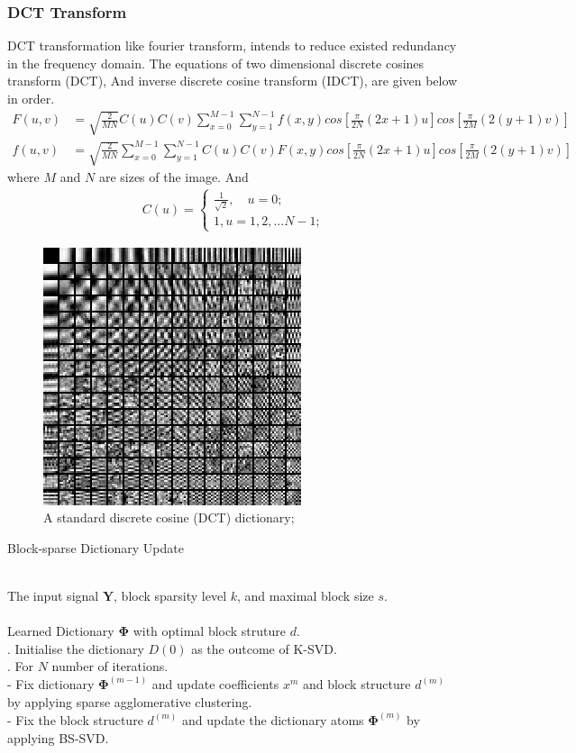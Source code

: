 
\subsubsection{DCT Transform}
DCT transformation like fourier transform, intends to reduce existed redundancy in the frequency domain. The equations of two dimensional discrete cosines transform (DCT), And inverse discrete cosine transform (IDCT), are given below in order.
\begin{align}
    F(u,v) &= \sqrt{\frac{2}{MN}}C(u)C(v)\sum_{x=0}^{M-1}\sum_{y=1}^{N-1}f(x,y)cos[\frac{\pi}{2N}(2x+1)u]cos[\frac{\pi}{2M}(2(y+1)v)] \\
    f(u,v) &= \sqrt{\frac{2}{MN}}\sum_{x=0}^{M-1}\sum_{y=1}^{N-1}C(u)C(v) F(x,y)cos[\frac{\pi}{2N}(2x+1)u]cos[\frac{\pi}{2M}(2(y+1)v)]
\end{align}
where $M$ and $N$ are sizes of the image. And 
\begin{align}
    C(u) = \begin{cases}
    \frac{1}{\sqrt{2}}, \quad u=0;\\
    1, u=1,2,...N-1;
    \end{cases}
\end{align}

\begin{figure}[!htbp]
\centering
\includegraphics[width=0.2\linewidth]{images/DCT_dict.png}
\caption{A standard discrete cosine (DCT) dictionary;}
\label{dic1}
\end{figure}

\begin{algorithm}[!htbp] 
\caption{Block-sparse Dictionary Update}
\label{alg:Framwork} 
\begin{algorithmic}
\REQUIRE ~~\\%
The input signal $\mathbf{Y}$, block sparsity level $k$, and maximal block size $s$.\\
\ENSURE ~~\\ %
Learned Dictionary $\mathbf{\Phi}$ with optimal block struture $d$.\\
. Initialise the dictionary $D(0)$ as the outcome of K-SVD.\\
. For $N$ number of iterations.\\
\STATE \quad - Fix dictionary $\mathbf{\Phi}^{(m-1)}$ and update coefficients $x^{m}$ and block structure $d^{(m)}$ by applying sparse agglomerative clustering.\\
\STATE \quad - Fix the block structure $d^(m)$ and update the dictionary atoms $\mathbf{\Phi}^{(m)}$ by applying BS-SVD.\\
\end{algorithmic}
\end{algorithm}

